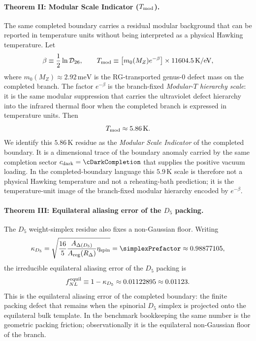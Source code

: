 \documentclass[11pt]{article}
\begin{document}
\paragraph{Theorem II: Modular Scale Indicator ($T_{\rm mod}$).}
The same completed boundary carries a residual modular background that can be
reported in temperature units without being interpreted as a physical Hawking
temperature. Let
\begin{equation}
 \beta
 \equiv
 \frac12\ln\mathcal D_{26},
 \qquad
 T_{\rm mod}
 \equiv
 \bigl[m_0(M_Z)e^{-\beta}\bigr]\times 11604.5\,\mathrm{K/eV},
\end{equation}
where $m_0(M_Z)\approx2.92\,\mathrm{meV}$ is the RG-transported genus-$0$
defect mass on the completed branch. The factor $e^{-\beta}$ is the
branch-fixed \emph{Modular-$T$ hierarchy scale}: it is the same modular
suppression that carries the ultraviolet defect hierarchy into the infrared
thermal floor when the completed branch is expressed in temperature units.
Then
\begin{equation}
 T_{\rm mod}
 \approx 5.86\,\mathrm{K}.
\end{equation}
We identify this $5.86\,\mathrm{K}$ residue as the \emph{Modular Scale
Indicator} of the completed boundary. It is a dimensional trace of the
boundary anomaly carried by the same completion sector
$c_{\rm dark}=\cDarkCompletion$ that supplies the positive vacuum loading. In
the completed-boundary language this $5.9\,\mathrm{K}$ scale is therefore not
a physical Hawking temperature and not a reheating-bath prediction; it is the
temperature-unit image of the branch-fixed modular hierarchy encoded by
$e^{-\beta}$.

\paragraph{Theorem III: Equilateral aliasing error of the $D_5$ packing.}
The $D_5$ weight-simplex residue also fixes a non-Gaussian floor. Writing
\begin{equation}
 \kappa_{D_5}
 =
 \sqrt{\frac{16}{5}
 \frac{A_{\Delta(D_5)}}{A_{\rm reg}(R_{\Delta})}
 \eta_{\rm spin}}
 = \simplexPrefactor
 \approx 0.98877105,
\end{equation}
the irreducible equilateral aliasing error of the $D_5$ packing is
\begin{equation}
 f_{NL}^{\rm equil}
 \equiv
 1-\kappa_{D_5}
 \approx 0.01122895
 \approx 0.01123.
\end{equation}
This is the equilateral aliasing error of the completed boundary: the finite
packing defect that remains when the spinorial $D_5$ simplex is projected onto
the equilateral bulk template. In the benchmark bookkeeping the same number is
the geometric packing friction; observationally it is the equilateral
non-Gaussian floor of the branch.
\end{document}
